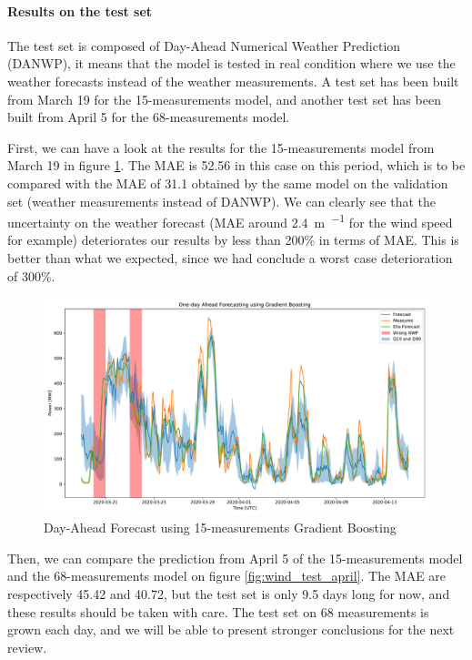 \documentclass[a4paper, 12pt]{article}
\begin{document}
\paragraph{Results on the test set}

The test set is composed of Day-Ahead Numerical Weather Prediction (DANWP), it means that the model is tested in real condition where we use the weather forecasts instead of the weather measurements. A test set has been built from March 19 for the 15-measurements model, and another test set has been built from April 5 for the 68-measurements model.

First, we can have a look at the results for the 15-measurements model from March 19 in figure \ref{fig:odaf15}. The MAE is 52.56 in this case on this period, which is to be compared with the MAE of 31.1 obtained by the same model on the validation set (weather measurements instead of DANWP). We can clearly see that the uncertainty on the weather forecast (MAE around \SI{2.4}{\meter\per{\second}} for the wind speed for example) deteriorates our results by less than 200\% in terms of MAE. This is better than what we expected, since we had conclude a worst case deterioration of 300\%.

\begin{figure}[H]
    \centering
    \includegraphics[width=\textwidth]{resources/pdf/odaf15.pdf}
    \caption{Day-Ahead Forecast using 15-measurements Gradient Boosting}
    \label{fig:odaf15}
\end{figure}

Then, we can compare the prediction from April 5 of the 15-measurements model and the 68-measurements model on figure \ref{fig:wind_test_april}. The MAE are respectively 45.42 and 40.72, but the test set is only 9.5 days long for now, and these results should be taken with care. The test set on 68 measurements is grown each day, and we will be able to present stronger conclusions for the next review.
\end{document}
